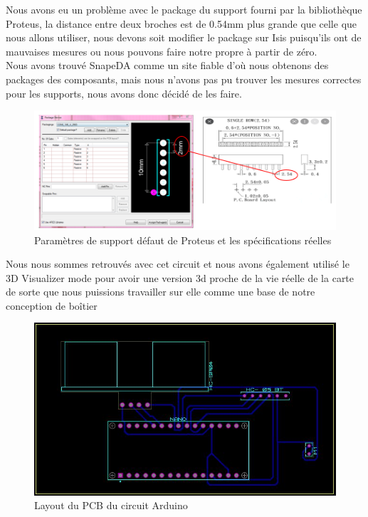 \FloatBarrier

Nous avons eu un problème avec le package du support fourni par la bibliothèque Proteus, la distance entre deux broches est de 0.54mm plus grande que celle que nous allons utiliser, nous devons soit modifier le package sur Isis puisqu’ils ont de mauvaises mesures ou nous pouvons faire notre propre à partir de zéro. \\
Nous avons trouvé SnapeDA comme un site fiable d’où nous obtenons des packages des composants, mais nous n’avons pas pu trouver les mesures correctes pour les supports, nous avons donc décidé de les faire.

\begin{figure}[!htbp]
    \centering
    \includegraphics[width=\textwidth]{assets/conception1/1.png}
    \caption{Paramètres de support défaut de Proteus et les spécifications réelles}
\end{figure}

\FloatBarrier

Nous nous sommes retrouvés avec cet circuit et nous avons également utilisé le 3D Visualizer mode pour avoir une version 3d proche de la vie réelle de la carte de sorte que nous puissions travailler sur elle comme une base de notre conception de boîtier

\begin{figure}[!htbp]
    \centering
    \includegraphics[width=.7\textwidth]{assets/conception1/img49.jpg}
    \caption{Layout du PCB du circuit Arduino}
\end{figure}

